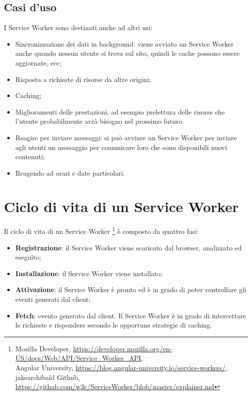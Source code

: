 \documentclass[11pt ,a4paper , twoside , openright ]{book}
\begin{document}
	\subsection{Casi d'uso}
	I Service Worker sono destinati anche ad altri usi:
	\begin{itemize}
		\item Sincronizzazione dei dati in background: viene avviato un Service Worker anche quando nessun utente si trova sul sito, quindi le cache possono essere aggiornate, ecc;
		\item Risposta a richieste di risorse da altre origini;
		\item Caching;
		\item Miglioramenti delle prestazioni, ad esempio prelettura delle risorse che l'utente probabilmente avrà bisogno nel prossimo futuro.
		\item Reagire per inviare messaggi: si può avviare un Service Worker per inviare agli utenti un messaggio per comunicare loro che sono disponibili nuovi contenuti;
		\item Reagendo ad orari e date particolari.
	\end{itemize}
	
	\section{Ciclo di vita di un Service Worker}
	Il ciclo di vita di un Service Worker \footnote{Mozilla Developer, \url{https://developer.mozilla.org/en-US/docs/Web/API/Service_Worker_API}, \\ Angular University, \url{https://blog.angular-university.io/service-workers/}, \\ jakearchibald Github, \url{https://github.com/w3c/ServiceWorker/blob/master/explainer.md}} è composto da quattro fasi:
	\begin{itemize}
		\item \textbf{Registrazione}: il Service Worker viene scaricato dal browser, analizzato ed eseguito;
		\item \textbf{Installazione}: il Service Worker viene installato;
		\item \textbf{Attivazione}: il Service Worker è pronto ed è in grado di poter controllare gli eventi generati dal client;
		\item\textbf{ Fetch}: evento generato dal client. Il Service Worker è in grado di intercettare le richieste e rispondere secondo le opportune strategie di caching. 
	\end{itemize}
	
\end{document}
